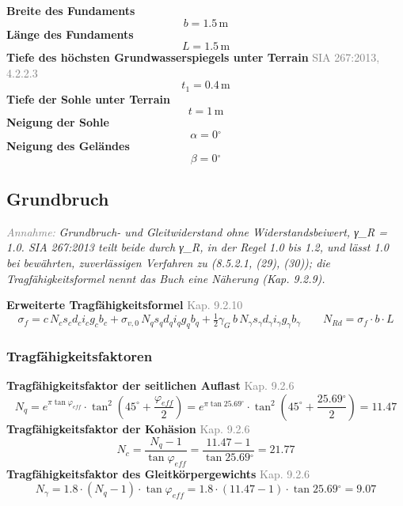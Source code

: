 \documentclass[11pt,a4paper]{article}
\newcommand{\normref}[1]{{\small\textcolor{gray}{#1}}}
\newcommand{\hinweis}[2]{\par\noindent\textcolor{gray}{\textit{#1:}} \textit{#2}\par}
\begin{document}
\noindent\textbf{Breite des Fundaments}
\begin{equation*}
b = 1.5\,\mathrm{m}
\end{equation*}
\noindent\textbf{Länge des Fundaments}
\begin{equation*}
L = 1.5\,\mathrm{m}
\end{equation*}
\noindent\textbf{Tiefe des höchsten Grundwasserspiegels unter Terrain} \hfill \normref{SIA 267:2013, 4.2.2.3}
\begin{equation*}
t_1 = 0.4\,\mathrm{m}
\end{equation*}
\noindent\textbf{Tiefe der Sohle unter Terrain}
\begin{equation*}
t = 1\,\mathrm{m}
\end{equation*}
\noindent\textbf{Neigung der Sohle}
\begin{equation*}
\alpha = 0{}^{\circ}
\end{equation*}
\noindent\textbf{Neigung des Geländes}
\begin{equation*}
\beta = 0{}^{\circ}
\end{equation*}
\subsection{Grundbruch}
\hinweis{Annahme}{Grundbruch- und Gleitwiderstand ohne Widerstandsbeiwert, γ\_R = 1.0. SIA 267:2013 teilt beide durch γ\_R, in der Regel 1.0 bis 1.2, und lässt 1.0 bei bewährten, zuverlässigen Verfahren zu (8.5.2.1, (29), (30)); die Tragfähigkeitsformel nennt das Buch eine Näherung (Kap. 9.2.9).}
\noindent\textbf{Erweiterte Tragfähigkeitsformel} \hfill \normref{Kap. 9.2.10}
\begin{equation*}
\sigma_f = c \, N_c s_c d_c i_c g_c b_c + \sigma_{v,0} \, N_q s_q d_q i_q g_q b_q + \tfrac{1}{2} \gamma_G \, b \, N_{\gamma} s_{\gamma} d_{\gamma} i_{\gamma} g_{\gamma} b_{\gamma} \qquad N_{Rd} = \sigma_f \cdot b \cdot L
\end{equation*}
\subsubsection{Tragfähigkeitsfaktoren}
\noindent\textbf{Tragfähigkeitsfaktor der seitlichen Auflast} \hfill \normref{Kap. 9.2.6}
\begin{equation*}
N_q = e^{\pi \tan \varphi_{eff}} \cdot \tan^{2}\left(45^\circ + \frac{\varphi_{eff}}{2}\right) = e^{\pi \tan 25.69{}^{\circ}} \cdot \tan^{2}\left(45^\circ + \frac{25.69{}^{\circ}}{2}\right) = 11.47
\end{equation*}
\noindent\textbf{Tragfähigkeitsfaktor der Kohäsion} \hfill \normref{Kap. 9.2.6}
\begin{equation*}
N_c = \frac{N_q - 1}{\tan \varphi_{eff}} = \frac{11.47 - 1}{\tan 25.69{}^{\circ}} = 21.77
\end{equation*}
\noindent\textbf{Tragfähigkeitsfaktor des Gleitkörpergewichts} \hfill \normref{Kap. 9.2.6}
\begin{equation*}
N_{\gamma} = 1.8 \cdot \left(N_q - 1\right) \cdot \tan \varphi_{eff} = 1.8 \cdot \left(11.47 - 1\right) \cdot \tan 25.69{}^{\circ} = 9.07
\end{equation*}
\end{document}
